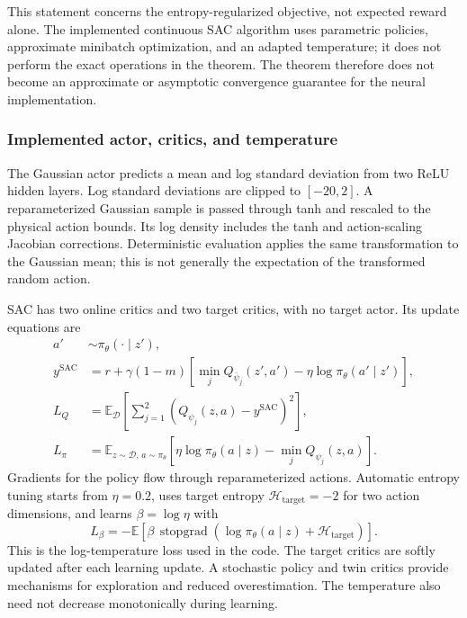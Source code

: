 \documentclass[11pt,a4paper]{article}
\theoremstyle{definition}
\theoremstyle{plain}
\theoremstyle{remark}
\newcommand{\E}{\mathbb{E}}
\begin{document}
This statement concerns the entropy-regularized objective, not expected reward alone. The implemented continuous SAC algorithm uses parametric policies, approximate minibatch optimization, and an adapted temperature; it does not perform the exact operations in the theorem. The theorem therefore does not become an approximate or asymptotic convergence guarantee for the neural implementation.

\subsubsection{Implemented actor, critics, and temperature}

The Gaussian actor predicts a mean and log standard deviation from two ReLU hidden layers. Log standard deviations are clipped to $[-20,2]$. A reparameterized Gaussian sample is passed through tanh and rescaled to the physical action bounds. Its log density includes the tanh and action-scaling Jacobian corrections. Deterministic evaluation applies the same transformation to the Gaussian mean; this is not generally the expectation of the transformed random action.

SAC has two online critics and two target critics, with no target actor. Its update equations are
\begin{align}
 a'&\sim\pi_\theta(\cdot\mid z'),\\
 y^{\mathrm{SAC}}&=r+\gamma(1-m)
 \left[\min_j Q_{\bar\psi_j}(z',a')-\eta\log\pi_\theta(a'\mid z')\right],\\
 L_Q&=\E_{\mathcal D}\left[\sum_{j=1}^2
              (Q_{\psi_j}(z,a)-y^{\mathrm{SAC}})^2\right],\\
 L_\pi&=\E_{z\sim\mathcal D,\,a\sim\pi_\theta}
              [\eta\log\pi_\theta(a\mid z)-\min_jQ_{\psi_j}(z,a)].
 \label{eq:sac-loss}
\end{align}
Gradients for the policy flow through reparameterized actions. Automatic entropy tuning starts from $\eta=0.2$, uses target entropy $\mathcal H_{\mathrm{target}}=-2$ for two action dimensions, and learns $\beta=\log\eta$ with
\begin{equation}
 L_\beta=-\E\left[\beta\,\operatorname{stopgrad}
       (\log\pi_\theta(a\mid z)+\mathcal H_{\mathrm{target}})\right].
\end{equation}
This is the log-temperature loss used in the code. The target critics are softly updated after each learning update. A stochastic policy and twin critics provide mechanisms for exploration and reduced overestimation. The temperature also need not decrease monotonically during learning.
\end{document}
